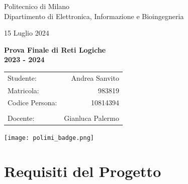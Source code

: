 \documentclass{article}
\begin{document}
\begin{titlepage}
    \vspace*{-\topskip}
    \centering

    \vspace{0.5cm} {
        \normalsize Politecnico di Milano \\ Dipartimento di Elettronica, Informazione e Bioingegneria
    }

    \vspace{5cm}
    {
        \large
        15 Luglio 2024
        \par
    }
    
    \vspace{0.25cm}
    {
        \LARGE
        \textbf{Prova Finale di Reti Logiche \\ 2023 - 2024}
        \par
    }
    
    \vspace{1.5cm}
    {
        \noindent
        \begin{center}
            \large
            \begin{tabular}{l r}
                Studente: & Andrea Sanvito \\
                Matricola: & 983819 \\
                Codice Persona: & 10814394 \\
                \\
                Docente: & Gianluca Palermo \\
            \end{tabular}
        \end{center}
    }

    \vspace{4.25cm}
    {
        \texttt{[image: polimi\_badge.png]}
    }
    
    \vfill
    \vspace*{-3.5cm}
\end{titlepage}



\section{Requisiti del Progetto}
\end{document}
